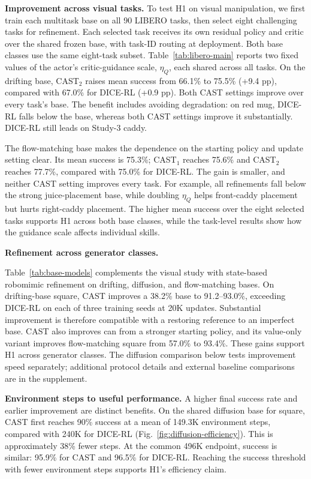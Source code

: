 \textbf{Improvement across visual tasks.}
To test H1 on visual manipulation, we first train each multitask base on
all 90 LIBERO tasks, then select eight challenging tasks for refinement.
Each selected task receives its own residual policy and critic over the
shared frozen base, with task-ID routing at deployment. Both base classes
use the same eight-task subset. Table~\ref{tab:libero-main} reports two fixed values
of the actor's critic-guidance scale, $\eta_Q$, each shared across all tasks.
On the drifting base, CAST$_2$ raises mean success from 66.1\% to 75.5\%
(+9.4 pp), compared with 67.0\% for DICE-RL (+0.9 pp).
Both CAST settings improve over every task's base. The benefit includes
avoiding degradation: on red mug, DICE-RL falls below the base, whereas
both CAST settings improve it substantially. DICE-RL still leads on
Study-3 caddy.

The flow-matching base makes the dependence on the starting policy and
update setting clear. Its mean success is 75.3\%; CAST$_1$ reaches 75.6\%
and CAST$_2$ reaches 77.7\%, compared with 75.0\% for DICE-RL. The gain
is smaller, and neither CAST setting improves every task. For example,
all refinements fall below the strong juice-placement base, while doubling
$\eta_Q$ helps front-caddy placement but hurts right-caddy placement.
The higher mean success over the eight selected tasks supports H1 across
both base classes, while the task-level results show how the guidance
scale affects individual skills.

\textbf{Refinement across generator classes.}
\label{sec:exp-robomimic}

Table~\ref{tab:base-models} complements the visual study with state-based
robomimic refinement on drifting, diffusion, and flow-matching bases. On drifting-base
square, CAST improves a 38.2\% base to 91.2--93.0\%, exceeding DICE-RL
on each of three training seeds at 20K updates. Substantial improvement
is therefore compatible with a restoring reference to an imperfect base.
CAST also improves can from a stronger starting policy, and its value-only
variant improves flow-matching square from 57.0\% to 93.4\%.
These gains support H1 across generator classes. The diffusion comparison
below tests improvement speed separately; additional protocol details and
external baseline comparisons are in the supplement.


\textbf{Environment steps to useful performance.}
A higher final success rate and earlier improvement are distinct benefits.
On the shared diffusion base for square, CAST first reaches 90\% success
at a mean of 149.3K environment steps, compared with 240K for DICE-RL
(Fig.~\ref{fig:diffusion-efficiency}). This is approximately 38\% fewer
steps. At the common 496K endpoint, success is similar: 95.9\% for CAST
and 96.5\% for DICE-RL. Reaching the success threshold with fewer
environment steps supports H1's efficiency claim.

